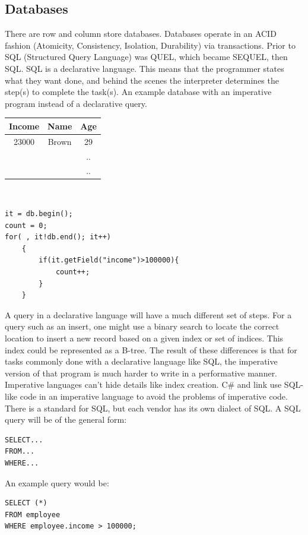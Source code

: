 \documentclass[twoside]{article}
\begin{document}
\subsection{Databases}
There are row and column store databases. Databases operate in an ACID fashion (Atomicity, Consistency, Isolation, Durability) via transactions. Prior to SQL (Structured Query Language) was QUEL, which became SEQUEL, then SQL. SQL is a declarative language. This means that the programmer states what they want done, and behind the scenes the interpreter determines the step(s) to complete the task(s).
An example database with an imperative program instead of a declarative query.\\
\begin{tabular}{c|c|c}
Income & Name & Age\\
\hline
23000 & Brown & 29 \\
 & & .. \\
 & & .. \\
 \hline
\end{tabular}
\\
\begin{lstlisting}
it = db.begin();
count = 0;
for( , it!db.end(); it++)
    {
        if(it.getField("income")>100000){
            count++;
        }
    }
\end{lstlisting}

A query in a declarative language will have a much different set of steps. For a query such as an insert, one might use a binary search to locate the correct location to insert a new record based on a given index or set of indices. This index could be represented as a B-tree. The result of these differences is that for tasks commonly done with a declarative language like SQL, the imperative version of that program is much harder to write in a performative manner. Imperative languages can't hide details like index creation. C\# and link use SQL-like code in an imperative language to avoid the problems of imperative code.\\
There is a standard for SQL, but each vendor has its own dialect of SQL. A SQL query will be of the general form:\\
\begin{lstlisting}
SELECT...
FROM...
WHERE...
\end{lstlisting}
An example query would be:
\begin{lstlisting}
SELECT (*)
FROM employee 
WHERE employee.income > 100000;
\end{lstlisting}
\end{document}
